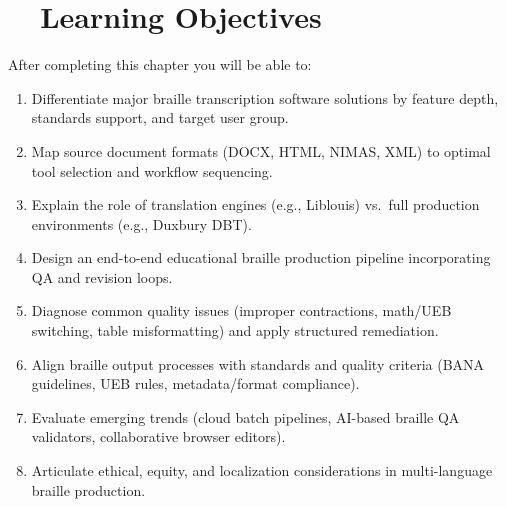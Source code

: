 \section{~~Learning Objectives}
\label{sec:braille-learning-objectives}
After completing this chapter you will be able to:
\begin{enumerate}
	\item Differentiate major braille transcription software solutions by feature depth, standards support, and target user group.
	\item Map source document formats (DOCX, HTML, NIMAS, XML) to optimal tool selection and workflow sequencing.
	\item Explain the role of translation engines (e.g., Liblouis) vs.\ full production environments (e.g., Duxbury DBT).
	\item Design an end-to-end educational braille production pipeline incorporating QA and revision loops.
	\item Diagnose common quality issues (improper contractions, math/UEB switching, table misformatting) and apply structured remediation.
	\item Align braille output processes with standards and quality criteria (BANA guidelines, UEB rules, metadata/format compliance).
	\item Evaluate emerging trends (cloud batch pipelines, AI-based braille QA validators, collaborative browser editors).
	\item Articulate ethical, equity, and localization considerations in multi-language braille production.
\end{enumerate}

